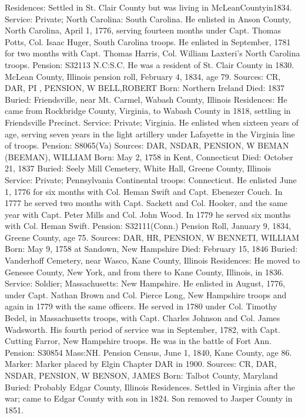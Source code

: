 Residences: Settled in St. Clair County but was living in McLeanCountyin1834. 
Service: Private; North Carolina: South Carolina. He enlisted in Anson County, North Carolina, April 1, 1776, serving fourteen months under Capt. Thomas Potts, Col. Isaac Huger, South Carolina troops. He enlisted in September, 1781 for two months with Capt. Thomas Harris, Col. William Laxteri's North Carolina troops. 
Pension: S32113 N.C:S.C. He was a resident of St. Clair County in 1830. McLean County, Illinois pension roll, February 4, 1834, age 79. 
Sources: CR, DAR, PI , PENSION, W 
BELL,ROBERT 
Born: Northern Ireland 
Died: 1837 
Buried: Friendsville, near Mt. Carmel, Wabash County, Illinois 
Residences: He came from Rockbridge County, Virginia, to Wabash County in 1818, settling in Friendsville Precinct. 
Service: Private; Virginia. He enlisted when sixteen years of age, serving seven years in the light artillery under Lafayette in the Virginia line of troops. 
Pension: S8065(Va) 
Sources: DAR, NSDAR, PENSION, W 
BEMAN (BEEMAN), WILLIAM 
Born: May 2, 1758 in Kent, Connecticut 
Died: October 21, 1837 
Buried: Seely Mill Cemetery, White Hall, Greene County, Illinois 
Service: Private; Pennsylvania Continental troops: Connecticut. He enlisted June 1, 1776 for six months with Col. Heman Swift and Capt. Ebenezer Couch. In 1777 he served two months with Capt. Sackett and Col. Hooker, and the same year with Capt. Peter Mills and Col. John Wood. In 1779 he served six months with Col. Heman Swift. 
Pension: S32111(Conn.) Pension Roll, January 9, 1834, Greene County, age 75. 
Sources: DAR, HR, PENSION, W 
BENNETI, WILLIAM 
Born: May 9, 1758 at Sandown, New Hampshire 
Died: February 15, 1846 
Buried: Vanderhoff Cemetery, near Wasco, Kane County, Illinois 
Residences: He moved to Genesee County, New York, and from there to Kane County, Illinois, in 1836. 
Service: Soldier; Massachusetts: New Hampshire. He enlisted in August, 1776, under Capt. Nathan Brown and Col. Pierce Long, New Hampshire troops and again in 1779 with the same officers. He served in 1780 under Col. Timothy Bedel, in Massachusetts troops, with Capt. Charles Johnson and Col. James Wadsworth. His fourth period of service was in September, 1782, with Capt. Cutting Farror, New Hampshire troops. He was in the battle of Fort Ann. 
Pension: S30854 Mass:NH. Pension Census, June 1, 1840, Kane County, age 86.  
Marker: Marker placed by Elgin Chapter DAR in 1900. 
Sources: CR, DAR, NSDAR, PENSION, W 
BENSON, JAMES 
Born: Talbot County, Maryland 
Buried: Probably Edgar County, Illinois 
Residences. Settled in Virginia after the war; came to Edgar County with son in 1824. Son removed to Jasper County in 1851. 
